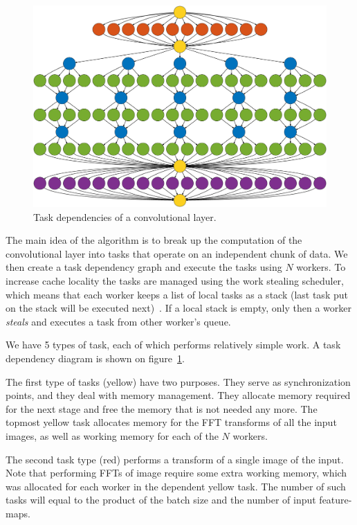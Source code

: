 \documentclass[conference]{IEEEtran}
\begin{document}
\begin{figure}
  \begin{center}
  \includegraphics[width=0.95\columnwidth]{fig/deps}
  \end{center}
  \caption{Task dependencies of a convolutional layer.}
  \label{fig:task_deps}
\end{figure}


The main idea of the algorithm is to break up the computation of the
convolutional layer into tasks that operate on an independent chunk of
data.  We then create a task dependency graph and execute the tasks
using $N$ workers.  To increase cache locality the tasks are managed
using the work stealing scheduler, which means that each worker keeps
a list of local tasks as a stack (last task put on the stack will be
executed next)~\cite{reinders2007intel}.  If a local stack is empty,
only then a worker \emph{steals} and executes a task from other
worker's queue.

We have 5 types of task, each of which performs relatively simple
work.  A task dependency diagram is shown on
figure~\ref{fig:task_deps}.

The first type of tasks (yellow) have two purposes.  They serve as
synchronization points, and they deal with memory management.  They
allocate memory required for the next stage and free the memory that
is not needed any more.  The topmost yellow task allocates memory for
the FFT transforms of all the input images, as well as working memory
for each of the $N$ workers.

The second task type (red) performs a transform of a single image of
the input.  Note that performing FFTs of image require some extra
working memory, which was allocated for each worker in the dependent
yellow task.  The number of such tasks will equal to the product of
the batch size and the number of input feature-maps.
\end{document}
